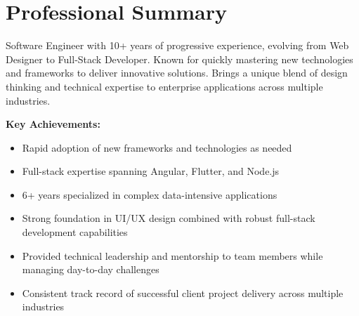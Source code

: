 \section{Professional Summary}
\noindent \large Software Engineer with 10+ years of progressive experience, evolving from Web Designer to Full-Stack Developer. Known for quickly mastering new technologies and frameworks to deliver innovative solutions. Brings a unique blend of design thinking and technical expertise to enterprise applications across multiple industries. \newline

\textbf{Key Achievements:}

\begin{itemize}[leftmargin=2em, itemsep=0.1em]
	\item Rapid adoption of new frameworks and technologies as needed
	\item Full-stack expertise spanning Angular, Flutter, and Node.js
	\item 6+ years specialized in complex data-intensive applications
	\item Strong foundation in UI/UX design combined with robust full-stack development capabilities
	\item Provided technical leadership and mentorship to team members while managing day-to-day challenges
	\item Consistent track record of successful client project delivery across multiple industries
\end{itemize}
\nopagebreak[4]